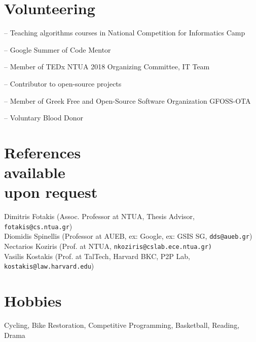 \documentclass[margin, 10pt]{res}
\begin{document}
\begin{resume}
\section{Volunteering} 
\begin{compactitem}
    \item[--] Teaching algorithms courses in National Competition for Informatics Camp 
    \item[--] Google Summer of Code Mentor
    \item[--] Member of TEDx NTUA 2018 Organizing Committee, IT Team 
    \item[--] Contributor to open-source projects
    \item[--] Member of Greek Free and Open-Source Software Organization GFOSS-OTA
    \item[--] Voluntary Blood Donor

\end{compactitem}

\section{References \\ available \\ upon request}

Dimitris Fotakis \hfill (Assoc. Professor at NTUA, Thesis Advisor, \texttt{fotakis@cs.ntua.gr}) \\
Diomidis Spinellis \hfill (Professor at AUEB, ex: Google, ex: GSIS SG, \texttt{dds@aueb.gr}) \\
Nectarios Koziris \hfill (Prof. at NTUA, \texttt{nkoziris@cslab.ece.ntua.gr)} \\
Vasilis Kostakis \hfill (Prof. at TalTech, Harvard BKC, P2P Lab, \texttt{kostakis@law.harvard.edu}) \\

\section{Hobbies}
Cycling, Bike Restoration, Competitive Programming, Basketball, Reading, Drama


\begin{comment}

\section{Selected \\ Projects \& Published \\ Software} 


\end{comment}
\end{resume}
\end{document}
